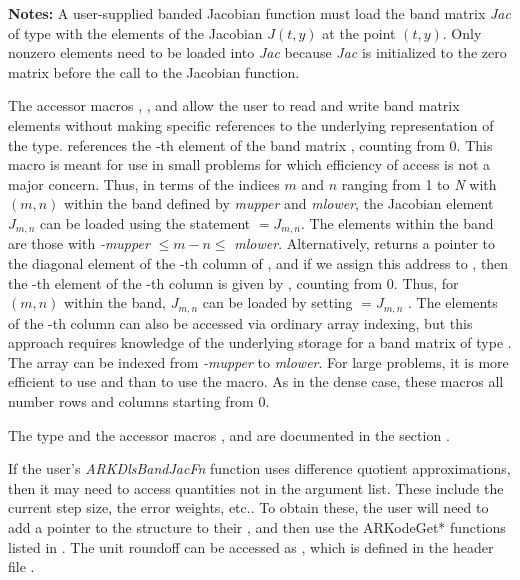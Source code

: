 \documentclass[letterpaper,10pt,english]{sphinxmanual}
\begin{document}
\begin{fulllineitems}
\textbf{Notes:} A user-supplied banded Jacobian function must load the band
matrix \emph{Jac} of type  with the elements of the Jacobian
\(J(t,y)\) at the point \((t,y)\). Only nonzero elements
need to be loaded into \emph{Jac} because \emph{Jac} is initialized to
the zero matrix before the call to the Jacobian function.

The accessor macros , , and
 allow the user to read and write band matrix
elements without making specific references to the underlying
representation of the  type.  
references the -th element of the band matrix ,
counting from 0. This macro is meant for use in small problems for
which efficiency of access is not a major concern. Thus, in terms
of the indices \(m\) and \(n\) ranging from 1 to \emph{N} with
\((m, n)\) within the band defined by \emph{mupper} and
\emph{mlower}, the Jacobian element \(J_{m,n}\) can be loaded
using the statement  \(=
J_{m,n}\). The elements within the band are those with \emph{-mupper}
\(\le m-n \le\) \emph{mlower}.  Alternatively, 
returns a pointer to the diagonal element of the -th column of
, and if we assign this address to , then
the -th element of the -th column is given by
, counting from 0. Thus, for
\((m,n)\) within the band, \(J_{m,n}\) can be loaded by
setting  \(= J_{m,n}\) . The elements of the -th column can
also be accessed via ordinary array indexing, but this approach
requires knowledge of the underlying storage for a band matrix of
type . The array  can be indexed from
\emph{-mupper} to \emph{mlower}. For large problems, it is more efficient
to use  and  than to use the
 macro. As in the dense case, these macros all number
rows and columns starting from 0.

The  type and the accessor macros ,
 and  are documented in the section
{\hyperref[linear_solvers/index:linearsolvers]{\emph{}}}.

If the user's \emph{ARKDlsBandJacFn} function uses difference quotient
approximations, then it may need to access quantities not in the
argument list.  These include the current step size, the error
weights, etc.. To obtain these, the user will need to add a pointer
to the  structure to their , and then use
the ARKodeGet* functions listed in
{\hyperref[c_interface/User_callable:cinterface-optionaloutputs]{\emph{}}}. The unit roundoff can be
accessed as , which is defined in the header
file .


\end{fulllineitems}
\end{document}

